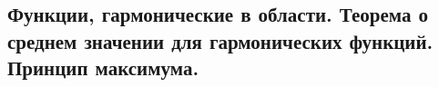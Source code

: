 \subsection{Функции, гармонические в области. Теорема о среднем значении для гармонических функций. Принцип максимума.}